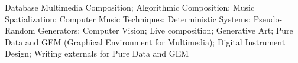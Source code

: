 Database Multimedia Composition; Algorithmic Composition; Music Spatialization; Computer Music Techniques; Deterministic Systems; Pseudo-Random Generators; Computer Vision; Live composition; Generative Art; Pure Data and GEM (Graphical Environment for Multimedia); Digital Instrument Design; Writing externals for Pure Data and GEM